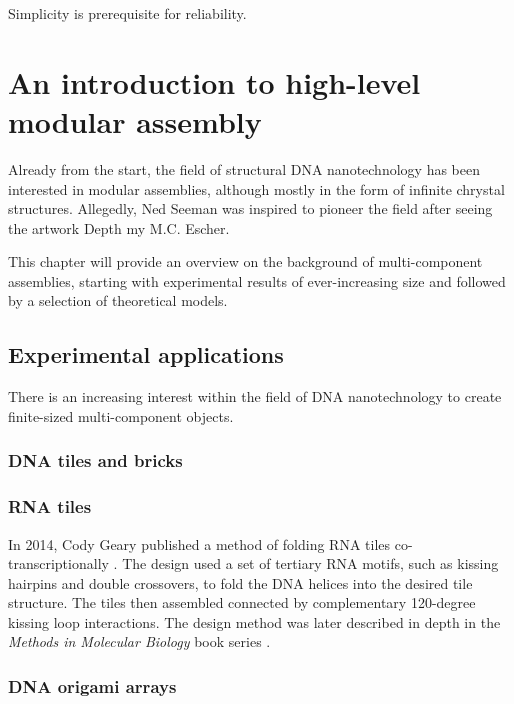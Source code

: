 \begin{savequote}[8cm]
Simplicity is prerequisite for reliability.
\end{savequote}

\chapter{An introduction to high-level modular assembly}

Already from the start, the field of structural DNA nanotechnology has been interested in modular assemblies, although mostly in the form of infinite chrystal structures. Allegedly, Ned Seeman was inspired to pioneer the field after seeing the artwork Depth my M.C. Escher.

This chapter will provide an overview on the background of multi-component assemblies, starting with experimental results of ever-increasing size and followed by a selection of theoretical models.

\section{Experimental applications} \label{sec:experimental_appl}
There is an increasing interest within the field of DNA nanotechnology to create finite-sized multi-component objects.
\subsection{DNA tiles and bricks}

\subsection{RNA tiles}
In 2014, Cody Geary published a method of folding RNA tiles co-transcriptionally \cite{geary2014single}. The design used a set of tertiary RNA motifs, such as kissing hairpins and double crossovers, to fold the DNA helices into the desired tile structure. The tiles then assembled connected by complementary 120-degree kissing loop interactions. The design method was later described in depth in the \emph{Methods in Molecular Biology} book series \cite{sparvath2017computer}.

\subsection{DNA origami arrays}

